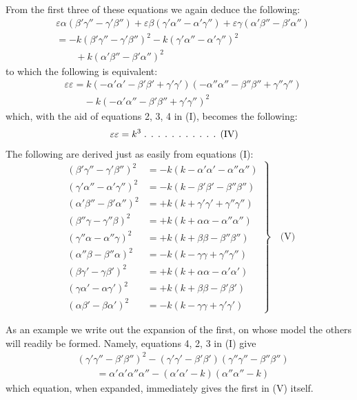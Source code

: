 From the first three of these equations we again deduce the following:
\[
\begin{aligned}
&\varepsilon\alpha(\beta'\gamma''-\gamma'\beta'')+\varepsilon\beta(\gamma'\alpha''-\alpha'\gamma'')+\varepsilon\gamma(\alpha'\beta''-\beta'\alpha'')\\[6pt]
&=-k(\beta'\gamma''-\gamma'\beta'')^2-k(\gamma'\alpha''-\alpha'\gamma'')^2\\[6pt]
&\qquad{}+k(\alpha'\beta''-\beta'\alpha'')^2
\end{aligned}
\]
to which the following is equivalent:
\[
\begin{aligned}
&\varepsilon\varepsilon=k(-\alpha'\alpha'-\beta'\beta'+\gamma'\gamma')(-\alpha''\alpha''-\beta''\beta''+\gamma''\gamma'')\\[6pt]
&\qquad{}-k(-\alpha'\alpha''-\beta'\beta''+\gamma'\gamma'')^2
\end{aligned}
\]
which, with the aid of equations 2, 3, 4 in (I), becomes the following:
\[
\begin{aligned}
&\varepsilon\varepsilon=k^3\;\ldotp\;\ldotp\;\ldotp\;\ldotp\;\ldotp\;\ldotp\;\ldotp\;\ldotp\;\ldotp\;\ldotp\;\ldotp\;\text{(IV)}
\end{aligned}
\]
The following are derived just as easily from equations (I):
\[
\left.\begin{aligned}
(\beta'\gamma''-\gamma'\beta'')^2&=-k(k-\alpha'\alpha'-\alpha''\alpha'')\\[5pt]
(\gamma'\alpha''-\alpha'\gamma'')^2&=-k(k-\beta'\beta'-\beta''\beta'')\\[5pt]
(\alpha'\beta''-\beta'\alpha'')^2&=+k(k+\gamma'\gamma'+\gamma''\gamma'')\\[5pt]
(\beta''\gamma-\gamma''\beta)^2&=+k(k+\alpha\alpha-\alpha''\alpha'')\\[5pt]
(\gamma''\alpha-\alpha''\gamma)^2&=+k(k+\beta\beta-\beta''\beta'')\\[5pt]
(\alpha''\beta-\beta''\alpha)^2&=-k(k-\gamma\gamma+\gamma''\gamma'')\\[5pt]
(\beta\gamma'-\gamma\beta')^2&=+k(k+\alpha\alpha-\alpha'\alpha')\\[5pt]
(\gamma\alpha'-\alpha\gamma')^2&=+k(k+\beta\beta-\beta'\beta')\\[5pt]
(\alpha\beta'-\beta\alpha')^2&=-k(k-\gamma\gamma+\gamma'\gamma')
\end{aligned}\right\}\quad\text{(V)}
\]

As an example we write out the expansion of the first, on whose model the others will readily be formed. Namely, equations 4, 2, 3 in (I) give
\[
\begin{aligned}
&(\gamma'\gamma''-\beta'\beta'')^2-(\gamma'\gamma'-\beta'\beta')(\gamma''\gamma''-\beta''\beta'')\\[6pt]
&\qquad{}=\alpha'\alpha'\alpha''\alpha''-(\alpha'\alpha'-k)(\alpha''\alpha''-k)
\end{aligned}
\]
which equation, when expanded, immediately gives the first in (V) itself.

